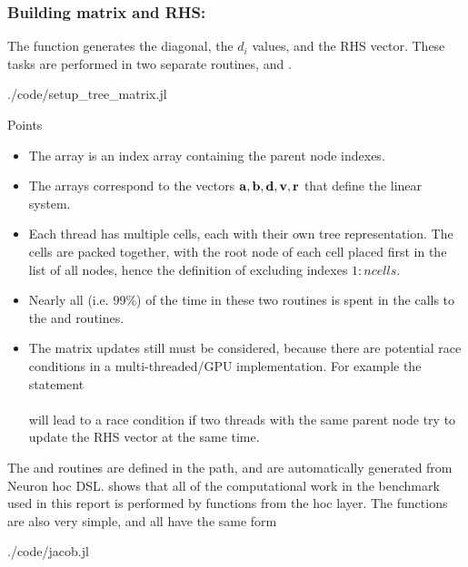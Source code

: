 \subsubsection{Building matrix and RHS: }
The function  generates the diagonal, the $d_i$ values, and the RHS vector. These tasks are performed in two separate routines,  and .
\begin{shaded}
 {./code/setup_tree_matrix.jl}
\end{shaded}

Points
\begin{itemize}
\item
    The array  is an index array containing the parent node indexes.
\item
    The arrays  correspond to the vectors $\mathbf{a}, \mathbf{b}, \mathbf{d}, \mathbf{v}, \mathbf{r}$ that define the linear system.
\item
    Each thread has multiple cells, each with their own tree representation. The cells are packed together, with the root node of each cell placed first in the list of all nodes, hence the definition of  excluding indexes $1:ncells$.
\item
    Nearly all (i.e. 99\%) of the time in these two routines is spent in the calls to the  and  routines.
\item
    The matrix updates still must be considered, because there are potential race conditions in a multi-threaded/GPU implementation. For example the statement \\  \\ will lead to a race condition if two threads with the same parent node try to update the RHS vector at the same time.
\end{itemize}

The  and  routines are defined in the  path, and are automatically generated from Neuron hoc DSL.  shows that all of the computational work in the \neuron benchmark used in this report is performed by functions from the hoc layer. The  functions are also very simple, and all have the same form 
\begin{shaded}
 {./code/jacob.jl}
\end{shaded}

